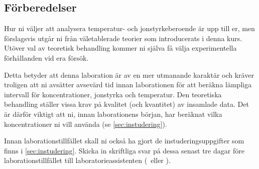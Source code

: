 \subsection{Förberedelser}
Hur ni väljer att analysera temperatur- och jonstyrkeberoende är
upp till er, men förslagsvis utgår ni från väletablerade
teorier som introducerats i denna kurs. Utöver val av teoretisk behandling
kommer ni själva få välja experimentella förhållanden vid era försök.

Detta betyder att denna laboration är av en mer utmanande karaktär och
kräver troligen att ni avsätter avsevärd tid innan laborationen för att
beräkna lämpliga intervall för koncentrationer, jonstyrka och
temperatur. Den teoretiska behandling ställer vissa krav på kvalitet (och
kvantitet) av insamlade data. Det är därför viktigt att ni, innan
laborationens början, har beräknat vilka koncentrationer ni vill
använda (se \cref{sec:instudering}).

Innan laborationstillfället skall ni också ha gjort de
instuderingsuppgifter som finns i \cref{sec:instudering}. Skicka in
skriftliga svar på dessa senast tre dagar före laborationstillfället till
laboratorieassistenten (\mailtobjorn\ eller \mailtocamilla).

